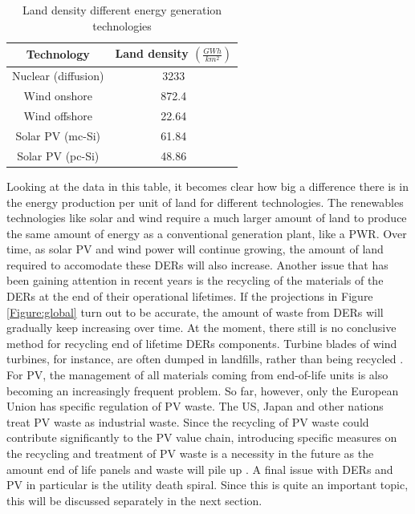  \begin{table}[h!]
 \begin{center}
  \begin{tabular}{||c|c||} 
  \hline 
  \textbf{Technology} & \textbf{Land density $(\frac{GWh}{km^2})$}\\
  \hline
  Nuclear (diffusion) & 3233 \\
  Wind onshore & 872.4 \\
  Wind offshore & 22.64\\
  Solar PV (mc-Si) & 61.84\\
  Solar PV (pc-Si) & 48.86\\
  \hline
  \end{tabular}
  \end{center}
  \caption[Land density different energy generation technologies]{Land density different  energy generation technologies \cite{land}}
  \label{table:land}
 \end{table}
 \noindent
 Looking at the data in this table, it becomes clear how big a difference there is in the energy production per unit of land for different technologies. The renewables technologies like solar and wind require a much larger amount of land to produce the same amount of energy as a conventional generation plant, like a PWR. Over time, as solar PV and wind power will continue growing, the amount of land required to accomodate these DERs will also increase.
 \newline \newline \noindent
 Another issue that has been gaining attention in recent years is the recycling of the materials of the DERs at the end of their operational lifetimes. If the projections in Figure \ref{Figure:global} turn out to be accurate, the amount of waste from DERs will gradually keep increasing over time. At the moment, there still is no conclusive method for recycling end of lifetime DERs components. Turbine blades of wind turbines, for instance, are often dumped in landfills, rather than being recycled \cite{recyclig}. For PV, the management of all materials coming from end-of-life units is also becoming an increasingly frequent problem. So far, however, only the European Union has specific regulation of PV waste. The US, Japan and other nations treat PV waste as industrial waste. Since the recycling of PV waste could contribute significantly to the PV value chain, introducing specific measures on the recycling and treatment of PV waste is a necessity in the future as the amount end of life panels and waste will pile up \cite{recycling}. 
 \newline \newline \noindent
 A final issue with DERs and PV in particular is the utility death spiral. Since this is quite an important topic, this will be discussed separately in the next section. 
